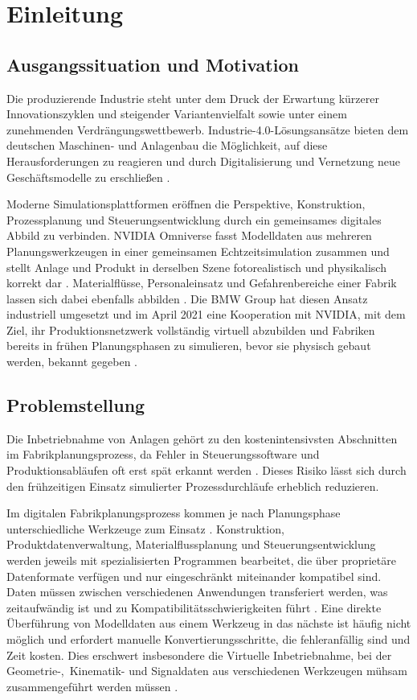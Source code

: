 \section{Einleitung}
\label{sec:einleitung}

\subsection{Ausgangssituation und Motivation}
Die produzierende Industrie steht unter dem Druck der Erwartung kürzerer Innovationszyklen und steigender Variantenvielfalt sowie unter einem zunehmenden Verdrängungswettbewerb. Industrie-4.0-Lösungsansätze bieten dem deutschen Maschinen- und Anlagenbau die Möglichkeit, auf diese Herausforderungen zu reagieren und durch Digitalisierung und Vernetzung neue Geschäftsmodelle zu erschließen \cite{plattformi40_fortschrittsbericht2024,kagermann2013,vdma_leitfaden_i40,monostori2014}.

Moderne Simulationsplattformen eröffnen die Perspektive, Konstruktion, Prozessplanung und Steuerungsentwicklung durch ein gemeinsames digitales Abbild zu verbinden. NVIDIA Omniverse fasst Modelldaten aus mehreren Planungswerkzeugen in einer gemeinsamen Echtzeitsimulation zusammen und stellt Anlage und Produkt in derselben Szene fotorealistisch und physikalisch korrekt dar \cite{nvidia_omniverse,nvidia_isaacsim}. Materialflüsse, Personaleinsatz und Gefahrenbereiche einer Fabrik lassen sich dabei ebenfalls abbilden \cite{bmw_nvidia_2021}. Die BMW Group hat diesen Ansatz industriell umgesetzt und im April 2021 eine Kooperation mit NVIDIA, mit dem Ziel, ihr Produktionsnetzwerk vollständig virtuell abzubilden und Fabriken bereits in frühen Planungsphasen zu simulieren, bevor sie physisch gebaut werden, bekannt gegeben \cite{bmw_nvidia_2021}.

\subsection{Problemstellung}
Die Inbetriebnahme von Anlagen gehört zu den kostenintensivsten Abschnitten im Fabrikplanungsprozess, da Fehler in Steuerungssoftware und Produktionsabläufen oft erst spät erkannt werden \cite{lechler2019,vdi3693}. Dieses Risiko lässt sich durch den frühzeitigen Einsatz simulierter Prozessdurchläufe erheblich reduzieren.

Im digitalen Fabrikplanungsprozess kommen je nach Planungsphase unterschiedliche Werkzeuge zum Einsatz \cite{vdi5200}. Konstruktion, Produktdatenverwaltung, Materialflussplanung und Steuerungsentwicklung werden jeweils mit spezialisierten Programmen bearbeitet, die über proprietäre Datenformate verfügen und nur eingeschränkt miteinander kompatibel sind. Daten müssen zwischen verschiedenen Anwendungen transferiert werden, was zeitaufwändig ist und zu Kompatibilitätsschwierigkeiten führt \cite{bmw_nvidia_2021}. Eine direkte Überführung von Modelldaten aus einem Werkzeug in das nächste ist häufig nicht möglich und erfordert manuelle Konvertierungsschritte, die fehleranfällig sind und Zeit kosten. Dies erschwert insbesondere die Virtuelle Inbetriebnahme, bei der \mbox{Geometrie-,}~Kinematik- und Signaldaten aus verschiedenen Werkzeugen mühsam zusammengeführt werden müssen \cite{vdi3693,lechler2019}.

